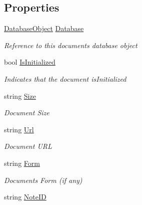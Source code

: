\subsection*{Properties}
\begin{DoxyCompactItemize}
\item 
\hyperlink{class_database_object}{Database\+Object} \hyperlink{class_document_object_a69d5338c9835f748490323d2950eed09}{Database}
\begin{DoxyCompactList}\small\item\em Reference to this documents database object \end{DoxyCompactList}\item 
bool \hyperlink{class_document_object_a3b2075b73f38d05091b69decc6ce7992}{Is\+Initialized}
\begin{DoxyCompactList}\small\item\em Indicates that the document is\+Initialized \end{DoxyCompactList}\item 
string \hyperlink{class_document_object_abdc1a6dfc1bb2261b523cf94468448b9}{Size}
\begin{DoxyCompactList}\small\item\em Document Size \end{DoxyCompactList}\item 
string \hyperlink{class_document_object_ac86b730cf8931b2221af577d32ca2f31}{Url}
\begin{DoxyCompactList}\small\item\em Document U\+RL \end{DoxyCompactList}\item 
string \hyperlink{class_document_object_ad3444a6c018474405064070fa9a94afe}{Form}
\begin{DoxyCompactList}\small\item\em Documents Form (if any) \end{DoxyCompactList}\item 
string \hyperlink{class_document_object_ac447461e3dc7f8258695f902ef0758a7}{Note\+ID}

\end{DoxyCompactItemize}
